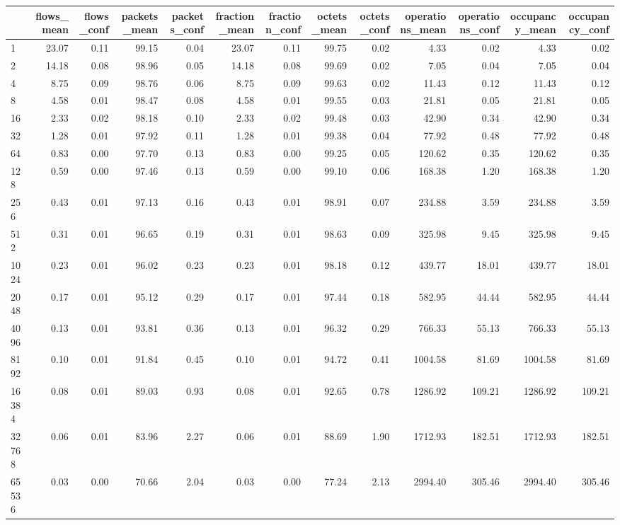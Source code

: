 \begin{tabular}{lrrrrrrrrrrrr}
\toprule
 & flows_mean & flows_conf & packets_mean & packets_conf & fraction_mean & fraction_conf & octets_mean & octets_conf & operations_mean & operations_conf & occupancy_mean & occupancy_conf \\
\midrule
1 & 23.07 & 0.11 & 99.15 & 0.04 & 23.07 & 0.11 & 99.75 & 0.02 & 4.33 & 0.02 & 4.33 & 0.02 \\
2 & 14.18 & 0.08 & 98.96 & 0.05 & 14.18 & 0.08 & 99.69 & 0.02 & 7.05 & 0.04 & 7.05 & 0.04 \\
4 & 8.75 & 0.09 & 98.76 & 0.06 & 8.75 & 0.09 & 99.63 & 0.02 & 11.43 & 0.12 & 11.43 & 0.12 \\
8 & 4.58 & 0.01 & 98.47 & 0.08 & 4.58 & 0.01 & 99.55 & 0.03 & 21.81 & 0.05 & 21.81 & 0.05 \\
16 & 2.33 & 0.02 & 98.18 & 0.10 & 2.33 & 0.02 & 99.48 & 0.03 & 42.90 & 0.34 & 42.90 & 0.34 \\
32 & 1.28 & 0.01 & 97.92 & 0.11 & 1.28 & 0.01 & 99.38 & 0.04 & 77.92 & 0.48 & 77.92 & 0.48 \\
64 & 0.83 & 0.00 & 97.70 & 0.13 & 0.83 & 0.00 & 99.25 & 0.05 & 120.62 & 0.35 & 120.62 & 0.35 \\
128 & 0.59 & 0.00 & 97.46 & 0.13 & 0.59 & 0.00 & 99.10 & 0.06 & 168.38 & 1.20 & 168.38 & 1.20 \\
256 & 0.43 & 0.01 & 97.13 & 0.16 & 0.43 & 0.01 & 98.91 & 0.07 & 234.88 & 3.59 & 234.88 & 3.59 \\
512 & 0.31 & 0.01 & 96.65 & 0.19 & 0.31 & 0.01 & 98.63 & 0.09 & 325.98 & 9.45 & 325.98 & 9.45 \\
1024 & 0.23 & 0.01 & 96.02 & 0.23 & 0.23 & 0.01 & 98.18 & 0.12 & 439.77 & 18.01 & 439.77 & 18.01 \\
2048 & 0.17 & 0.01 & 95.12 & 0.29 & 0.17 & 0.01 & 97.44 & 0.18 & 582.95 & 44.44 & 582.95 & 44.44 \\
4096 & 0.13 & 0.01 & 93.81 & 0.36 & 0.13 & 0.01 & 96.32 & 0.29 & 766.33 & 55.13 & 766.33 & 55.13 \\
8192 & 0.10 & 0.01 & 91.84 & 0.45 & 0.10 & 0.01 & 94.72 & 0.41 & 1004.58 & 81.69 & 1004.58 & 81.69 \\
16384 & 0.08 & 0.01 & 89.03 & 0.93 & 0.08 & 0.01 & 92.65 & 0.78 & 1286.92 & 109.21 & 1286.92 & 109.21 \\
32768 & 0.06 & 0.01 & 83.96 & 2.27 & 0.06 & 0.01 & 88.69 & 1.90 & 1712.93 & 182.51 & 1712.93 & 182.51 \\
65536 & 0.03 & 0.00 & 70.66 & 2.04 & 0.03 & 0.00 & 77.24 & 2.13 & 2994.40 & 305.46 & 2994.40 & 305.46 \\

\end{tabular}
